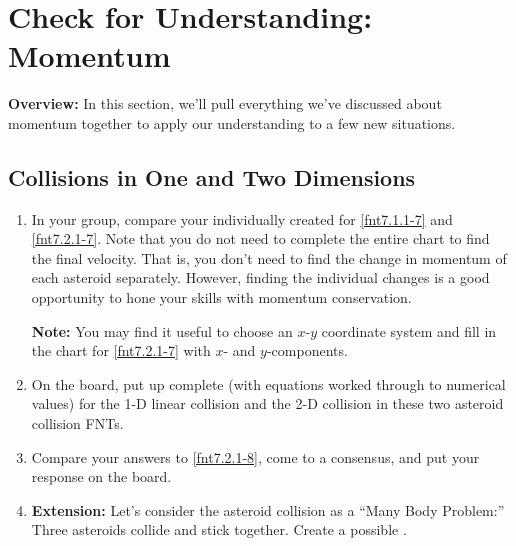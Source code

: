 \section{Check for Understanding: Momentum}
\label{act7.2.3}

\begin{overview}

	\textbf{Overview:} In this section, we'll pull everything we've discussed about momentum together to apply our understanding to a few new situations.
	
\end{overview}


\subsection{Collisions in One and Two Dimensions}

\begin{fnt}
	
\end{fnt}

\begin{fnt}
	
\end{fnt}

\begin{fnt}
	
\end{fnt}

\begin{enumerate}
	\item In your group, compare your individually created \pcharts{} for \ref{fnt7.1.1-7} and \ref{fnt7.2.1-7}. Note that you do not need to complete the entire chart to find the final velocity. That is, you don't need to find the change in momentum of each asteroid separately. However, finding the individual changes is a good opportunity to hone your skills with momentum conservation.
	
	\textbf{Note:} You may find it useful to choose an $x$-$y$ coordinate system and fill in the chart for \ref{fnt7.2.1-7} with $x$- and $y$-components.
	
	\item On the board, put up complete \pcharts{} (with equations worked through to numerical values) for the 1-D linear collision and the 2-D collision in these two asteroid collision FNTs.
	
	\item Compare your answers to \ref{fnt7.2.1-8}, come to a consensus, and put your response on the board.
	
	\item \textbf{Extension:} Let's consider the asteroid collision as a ``Many Body Problem:'' Three asteroids collide and stick together. Create a possible \pchart{}.
\end{enumerate}

